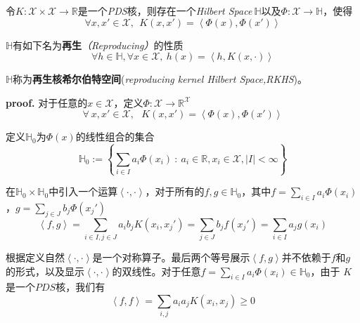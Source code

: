 \begin{mdframed}
    \begin{theorem}
        令$K:\mathcal{X}\times \mathcal{X}\rightarrow \mathbb{R}$是一个\textsl{PDS}核，则存在一个\textsl{Hilbert Space}$\ \mathbb{H}$以及$\Phi:\mathcal{X}\rightarrow \mathbb{H}$，使得
        \begin{equation}
            \forall x,x'\in \mathcal{X},\ \ K(x,x')=\left<\Phi(x),\Phi(x')\right>
        \end{equation}

        $\mathbb{H}$有如下名为\textbf{再生}\textsl{（Reproducing）}的性质
        \begin{equation}
            \forall h\in \mathbb{H},\forall x\in \mathcal{X},\ h(x)=\left< h,K(x,\cdot) \right>
        \end{equation}

        $\mathbb{H}$称为\textbf{再生核希尔伯特空间}(\textsl{reproducing kernel Hilbert Space,RKHS})。
    \end{theorem}
\end{mdframed}

\textbf{proof.}\hspace{1em} 对于任意的$x\in \mathcal{X}$，定义$\Phi:\mathcal{X}\rightarrow \mathbb{R}^\mathcal{X}$
\begin{equation}
    \forall\ x,x'\in \mathcal{X},\ \ \ K(x,x')=\left< \Phi(x),\Phi(x') \right>
\end{equation}

定义$\mathbb{H}_0$为$\Phi(x)$的线性组合的集合
\begin{equation}
    \mathbb{H}_0:=\left\{ \sum_{i\in I}a_i\Phi(x_i)\ :\ a_i\in \mathbb{R},x_i\in \mathcal{X},|I|<\infty \right\}
\end{equation}

在$\mathbb{H}_0\times \mathbb{H}_0$中引入一个运算$\left< \cdot,\cdot \right>$，对于所有的$f,g\in \mathbb{H}_0$，其中$f=\sum_{i\in I} a_i\Phi(x_i)$，$g=\sum_{j\in J} b_j\Phi(x_j')$
\begin{equation}
    \left<f,g\right>=\sum_{i\in I,j\in J} a_i b_j K(x_i,x_j')=\sum_{j\in J}b_j f(x_j')=\sum_{i\in I}a_j g(x_i)
\end{equation}

根据定义自然$\left< \cdot,\cdot \right>$是一个对称算子。最后两个等号展示$\left< f,g \right>$并不依赖于$f$和$g$的形式，以及显示$\left< \cdot,\cdot \right>$的双线性。对于任意$f=\sum_{i\in I} a_i\Phi(x_i)\in \mathbb{H}_0$，由于
$K$是一个$PDS$核，我们有
\begin{equation}
    \left<f,f\right>=\sum_{i,j} a_i a_j K(x_i,x_j)\geqslant 0
\end{equation}

